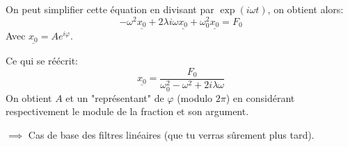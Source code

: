 \documentclass{beamer}
\begin{document}
\begin{frame}
    On peut simplifier cette équation en divisant par $\exp(i\omega t)$, on obtient alors:
    \begin{equation}
        -\omega^2 \underline{x_0} + 2\lambda i \omega \underline{x_0} + \omega_0^2 \underline{x_0} = F_0
    \end{equation}
    Avec $\underline{x_0} = A e^{i\varphi}$.

    Ce qui se réécrit:
    \begin{equation}
        \underline{x_0} = \frac{F_0}{\omega_0^2 - \omega^2 + 2i\lambda \omega}
    \end{equation}
    On obtient $A$ et un "représentant" de $\varphi$ (modulo $2\pi$) en considérant respectivement le module de la fraction et son argument.

    $\implies$ Cas de base des filtres linéaires (que tu verras sûrement plus tard).
\end{frame}
\end{document}
